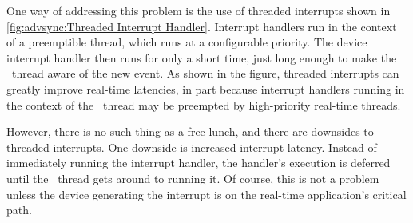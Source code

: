 
One way of addressing this problem is the use of threaded interrupts shown in
\cref{fig:advsync:Threaded Interrupt Handler}.
Interrupt handlers run in the context of a preemptible  thread,
which runs at a configurable priority.
The device interrupt handler then runs for only a short time, just
long enough to make the \IRQ\ thread aware of the new event.
As shown in the figure, threaded interrupts can greatly improve
real-time latencies, in part because interrupt handlers running in
the context of the \IRQ\ thread may be preempted by high-priority real-time
threads.

However, there is no such thing as a free lunch, and there are downsides
to threaded interrupts.
One downside is increased interrupt latency.
Instead of immediately running the interrupt handler, the handler's execution
is deferred until the \IRQ\ thread gets around to running it.
Of course, this is not a problem unless the device generating the interrupt
is on the real-time application's critical path.

